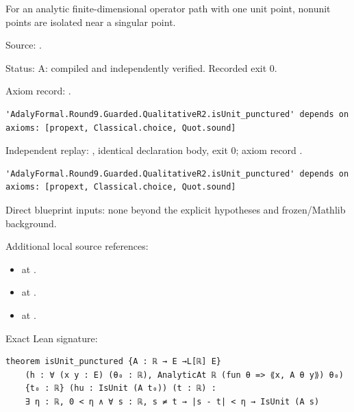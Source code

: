 \begin{theorem}[bp-109]
\label{bp-109}
\uses{}
\leanok
For an analytic finite-dimensional operator path with one unit point, nonunit points are isolated near a singular point.

\par Source: \texttt{}.
\par Status: A: compiled and independently verified. Recorded exit 0.
\par Axiom record: \texttt{}.
\begin{verbatim}
'AdalyFormal.Round9.Guarded.QualitativeR2.isUnit_punctured' depends on axioms: [propext, Classical.choice, Quot.sound]
\end{verbatim}
\par Independent replay: \texttt{}, identical declaration body, exit 0; axiom record \texttt{}.
\begin{verbatim}
'AdalyFormal.Round9.Guarded.QualitativeR2.isUnit_punctured' depends on axioms: [propext, Classical.choice, Quot.sound]
\end{verbatim}
\par Direct blueprint inputs: none beyond the explicit hypotheses and frozen/Mathlib background.
\par Additional local source references:
\begin{itemize}
\item \texttt{} at \texttt{}.
\item \texttt{} at \texttt{}.
\item \texttt{} at \texttt{}.
\end{itemize}
\par Exact Lean signature:
\begin{verbatim}
theorem isUnit_punctured {A : ℝ → E →L[ℝ] E}
    (h : ∀ (x y : E) (θ₀ : ℝ), AnalyticAt ℝ (fun θ => ⟪x, A θ y⟫) θ₀)
    {t₀ : ℝ} (hu : IsUnit (A t₀)) (t : ℝ) :
    ∃ η : ℝ, 0 < η ∧ ∀ s : ℝ, s ≠ t → |s - t| < η → IsUnit (A s)
\end{verbatim}
\end{theorem}

